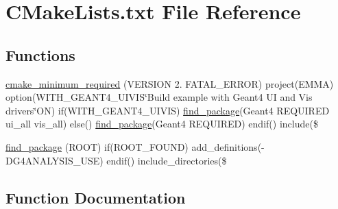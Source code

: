 \hypertarget{CMakeLists_8txt}{}\section{C\+Make\+Lists.\+txt File Reference}
\label{CMakeLists_8txt}
\subsection*{Functions}
\begin{DoxyCompactItemize}
\item 
\hyperlink{CMakeLists_8txt_a96d513d95f99c6a7d814bc5219aa207a}{cmake\+\_\+minimum\+\_\+required} (V\+E\+R\+S\+I\+ON 2. F\+A\+T\+A\+L\+\_\+\+E\+R\+R\+OR) project(E\+M\+MA) option(W\+I\+T\+H\+\_\+\+G\+E\+A\+N\+T4\+\_\+\+U\+I\+V\+IS\char`\"{}Build example with Geant4 UI and Vis drivers\char`\"{}ON) if(W\+I\+T\+H\+\_\+\+G\+E\+A\+N\+T4\+\_\+\+U\+I\+V\+IS) \hyperlink{CMakeLists_8txt_ac8b9ea4be7802858ed602bf5474e31b4}{find\+\_\+package}(Geant4 R\+E\+Q\+U\+I\+R\+ED ui\+\_\+all vis\+\_\+all) else() \hyperlink{CMakeLists_8txt_ac8b9ea4be7802858ed602bf5474e31b4}{find\+\_\+package}(Geant4 R\+E\+Q\+U\+I\+R\+ED) endif() include(\$
\item 
\hyperlink{CMakeLists_8txt_ac8b9ea4be7802858ed602bf5474e31b4}{find\+\_\+package} (R\+O\+OT) if(R\+O\+O\+T\+\_\+\+F\+O\+U\+ND) add\+\_\+definitions(-\/D\+G4\+A\+N\+A\+L\+Y\+S\+I\+S\+\_\+\+U\+SE) endif() include\+\_\+directories(\$
\end{DoxyCompactItemize}


\subsection{Function Documentation}
